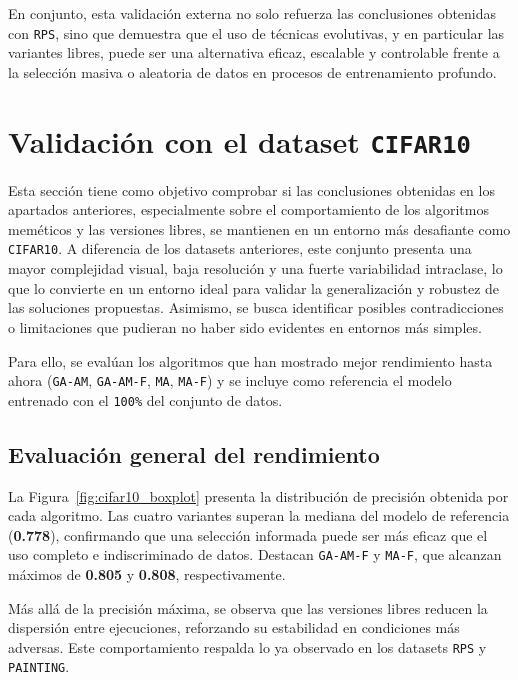 En conjunto, esta validación externa no solo refuerza las conclusiones obtenidas con \texttt{RPS},
sino que demuestra que el uso de técnicas evolutivas, y en particular las variantes libres, puede ser una alternativa eficaz,
escalable y controlable frente a la selección masiva o aleatoria de datos en procesos de entrenamiento profundo.


\section{Validación con el dataset \texttt{CIFAR10}}
Esta sección tiene como objetivo comprobar si las conclusiones obtenidas en los apartados anteriores, especialmente sobre el comportamiento de los algoritmos meméticos y las versiones libres, se mantienen en un entorno más desafiante como \texttt{CIFAR10}. A diferencia de los datasets anteriores, este conjunto presenta una mayor complejidad visual, baja resolución y una fuerte variabilidad intraclase, lo que lo convierte en un entorno ideal para validar la generalización y robustez de las soluciones propuestas. Asimismo, se busca identificar posibles contradicciones o limitaciones que pudieran no haber sido evidentes en entornos más simples.

Para ello, se evalúan los algoritmos que han mostrado mejor rendimiento hasta ahora (\texttt{GA-AM}, \texttt{GA-AM-F}, \texttt{MA}, \texttt{MA-F}) y se incluye como referencia el modelo entrenado con el \texttt{100\%} del conjunto de datos.

\subsection{Evaluación general del rendimiento}

La Figura~\ref{fig:cifar10_boxplot} presenta la distribución de precisión obtenida por cada algoritmo. Las cuatro variantes superan la mediana del modelo de referencia (\textbf{0.778}), confirmando que una selección informada puede ser más eficaz que el uso completo e indiscriminado de datos. Destacan \texttt{GA-AM-F} y \texttt{MA-F}, que alcanzan máximos de \textbf{0.805} y \textbf{0.808}, respectivamente.

Más allá de la precisión máxima, se observa que las versiones libres reducen la dispersión entre ejecuciones, reforzando su estabilidad en condiciones más adversas. Este comportamiento respalda lo ya observado en los datasets \texttt{RPS} y \texttt{PAINTING}.

